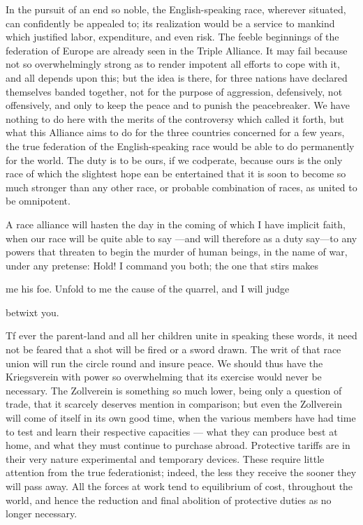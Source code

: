 \documentclass[11pt,openany]{book}
\begin{document}
In the pursuit of an end so noble, the English-speaking race, wherever situated, can confidently be appealed to; its realization would be a service to mankind which justified labor, expenditure, and even risk. The feeble beginnings of the federation of Europe are already seen in the Triple Alliance. It may fail because not so overwhelmingly strong as to render impotent all efforts to cope with it, and all depends upon this; but the idea is there, for three nations have declared themselves banded together, not for the purpose of aggression, defensively, not offensively, and only to keep the peace and to punish the peacebreaker. We have nothing to do here with the merits of the controversy which called it forth, but what this Alliance aims to do for the three countries concerned for a few years, the true federation of the English-speaking race would be able to do permanently for the world. The duty is to be ours, if we codperate, because ours is the only race of which the slightest hope ean be entertained that it is soon to become so much stronger than any other race, or probable combination of races, as united to be omnipotent.

A race alliance will hasten the day in the coming of which I have implicit faith, when our race will be quite able to say ---and will therefore as a duty say---to any powers that threaten to begin the murder of human beings, in the name of war, under any pretense: Hold! I command you both; the one that stirs makes

me his foe. Unfold to me the cause of the quarrel, and I will judge

betwixt you.

Tf ever the parent-land and all her children unite in speaking these words, it need not be feared that a shot will be fired or a sword drawn. The writ of that race union will run the circle round and insure peace. We should thus have the Kriegsverein with power so overwhelming that its exercise would never be necessary. The Zollverein is something so much lower, being only a question of trade, that it scarcely deserves mention in comparison; but even the Zollverein will come of itself in its own good time, when the various members have had time to test and learn their respective capacities --- what they can produce best at home, and what they must continue to purchase abroad. Protective tariffs are in their very nature experimental and temporary devices. These require little attention from the true federationist; indeed, the less they receive the sooner they will pass away. All the forces at work tend to equilibrium of cost, throughout the world, and hence the reduction and final abolition of protective duties as no longer necessary.
\end{document}
